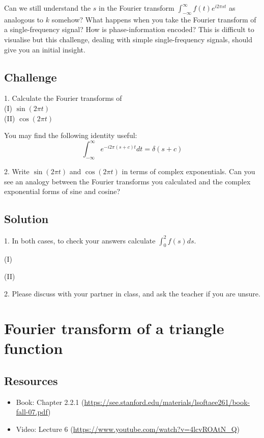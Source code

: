 Can we still understand the $s$ in the Fourier transform $\int_{-\infty}^{\infty} f(t) e^{i 2 \pi s t}$ as analogous to $k$ somehow? What happens when you take the Fourier transform of a single-frequency signal? How is phase-information encoded? This is difficult to visualise but this challenge, dealing with simple single-frequency signals, should give you an initial insight.

\subsection*{Challenge}
1. Calculate the Fourier transforms of\\
(I) $\sin(2 \pi t)$\\
(II) $\cos(2 \pi t)$

You may find the following identity useful:
\begin{equation}
    \int_{-\infty}^{\infty} e^{-i 2 \pi (s+c) t} dt = \delta(s+c)
\end{equation}

2. Write $\sin(2 \pi t)$ and $\cos(2 \pi t)$ in terms of complex exponentials. Can you see an analogy between the Fourier transforms you calculated and the complex exponential forms of sine and cosine?

\subsection*{Solution}
1. In both cases, to check your answers calculate $\int_0^2 f(s) ds$.

(I)\\

(II)\\

2. Please discuss with your partner in class, and ask the teacher if you are unsure.



\newpage
\section{Fourier transform of a triangle function}
\label{sec:ft_triangle}

\subsection*{Resources}
\begin{itemize}
    \item Book: Chapter 2.2.1 (\url{https://see.stanford.edu/materials/lsoftaee261/book-fall-07.pdf})
    \item Video: Lecture 6 (\url{https://www.youtube.com/watch?v=4lcvROAtN_Q})
\end{itemize}

